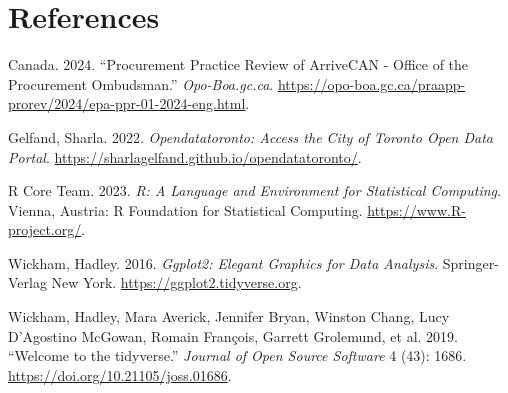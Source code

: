 \documentclass[
  letterpaper,
  DIV=11,
  numbers=noendperiod]{scrartcl}
\newlength{\cslhangindent}
\newenvironment{CSLReferences}[2] %
 {\begin{list}{}{%
  \setlength{\itemindent}{0pt}
  \setlength{\leftmargin}{0pt}
  \setlength{\parsep}{0pt}
  \ifodd #1
   \setlength{\leftmargin}{\cslhangindent}
   \setlength{\itemindent}{-1\cslhangindent}
  \fi
  \setlength{\itemsep}{#2\baselineskip}}}
 {\end{list}}
\begin{document}
\section*{References}\label{references}

\label{refs}
\begin{CSLReferences}{1}{0}
Canada. 2024. {``Procurement Practice Review of ArriveCAN - Office of
the Procurement Ombudsman.''} \emph{Opo-Boa.gc.ca}.
\url{https://opo-boa.gc.ca/praapp-prorev/2024/epa-ppr-01-2024-eng.html}.

Gelfand, Sharla. 2022. \emph{Opendatatoronto: Access the City of Toronto
Open Data Portal}.
\url{https://sharlagelfand.github.io/opendatatoronto/}.

R Core Team. 2023. \emph{R: A Language and Environment for Statistical
Computing}. Vienna, Austria: R Foundation for Statistical Computing.
\url{https://www.R-project.org/}.

Wickham, Hadley. 2016. \emph{Ggplot2: Elegant Graphics for Data
Analysis}. Springer-Verlag New York.
\url{https://ggplot2.tidyverse.org}.

Wickham, Hadley, Mara Averick, Jennifer Bryan, Winston Chang, Lucy
D'Agostino McGowan, Romain François, Garrett Grolemund, et al. 2019.
{``Welcome to the {tidyverse}.''} \emph{Journal of Open Source Software}
4 (43): 1686. \url{https://doi.org/10.21105/joss.01686}.

\end{CSLReferences}
\end{document}
